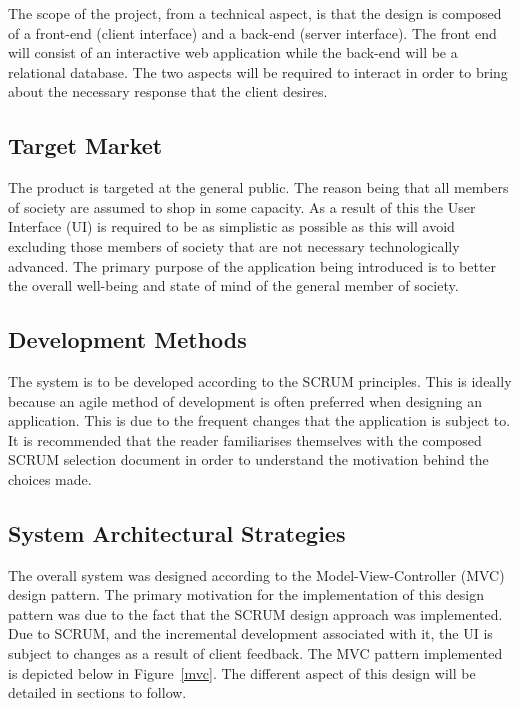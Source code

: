 \documentclass[10pt,twocolumn]{witseiepaper}
\begin{document}
		The scope of the project, from a technical aspect, is that the design is composed of a front-end (client interface) and a back-end (server interface). The front end will consist of an interactive web application while the back-end will be a relational database. The two aspects will be required to interact in order to bring about the necessary response that the client desires. 

	\subsection{Target Market}
	
		The product is targeted at the general public. The reason being that all members of society are assumed to shop in some capacity. As a result of this the User Interface (UI) is required to be as simplistic as possible as this will avoid excluding those members of society that are not necessary technologically advanced. The primary purpose of the application being introduced is to better the overall well-being and state of mind of the general member of society. 
		
	\subsection{Development Methods}
	
		The system is to be developed according to the SCRUM principles. This is ideally because an agile method of development is often preferred when designing an application. This is due to the frequent changes that the application is subject to. It is recommended that the reader familiarises themselves with the composed SCRUM selection document in order to understand the motivation behind the choices made.
	
	\subsection{System Architectural Strategies}
	
		The overall system was designed according to the Model-View-Controller (MVC) design pattern. The primary motivation for the implementation of this design pattern was due to the fact that the SCRUM design approach was implemented. Due to SCRUM, and the incremental development associated with it, the UI is subject to changes as a result of client feedback. The MVC pattern implemented is depicted below in Figure~\ref{mvc}. The different aspect of this design will be detailed in sections to follow.
		
\end{document}
